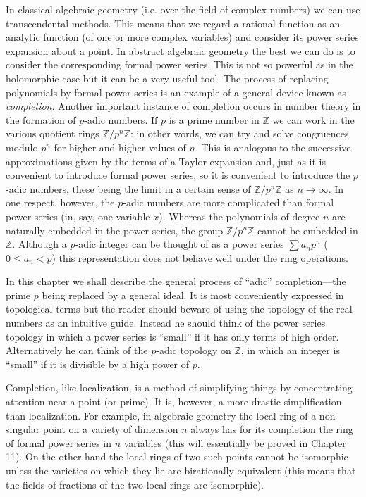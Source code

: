 In classical algebraic geometry (i.e. over the field of complex numbers) we can use transcendental methods. This means that we regard a rational function as an analytic function (of one or more complex variables) and consider its power series expansion about a point. In abstract algebraic geometry the best we can do is to consider the corresponding formal power series. This is not so powerful as in the holomorphic case but it can be a very useful tool. The process of replacing polynomials by formal power series is an example of a general device known as \textit{completion}. Another important instance of completion occurs in number theory in the formation of $p$-adic numbers. If $p$ is a prime number in $\mathbb Z$ we can work in the various quotient rings $\mathbb Z/p^n\mathbb Z$: in other words, we can try and solve congruences modulo $p^n$ for higher and higher values of $n$. This is analogous to the successive approximations given by the terms of a Taylor expansion and, just as it is convenient to introduce formal power series, so it is convenient to introduce the $p$-adic numbers, these being the limit in a certain sense of $\mathbb Z/p^n\mathbb Z$ as $n\longrightarrow\infty$. In one respect, however, the $p$-adic numbers are more complicated than formal power series (in, say, one variable $x$). Whereas the polynomials of degree $n$ are naturally embedded in the power series, the group $\mathbb Z/p^n\mathbb Z$ cannot be embedded in $\mathbb Z$. Although a $p$-adic integer can be thought of as a power series $\sum a_np^n$ ($0\leq a_n<p$) this representation does not behave well under the ring operations.

In this chapter we shall describe the general process of ``adic'' completion---the prime $p$ being replaced by a general ideal. It is most conveniently expressed in topological terms but the reader should beware of using the topology of the real numbers as an intuitive guide. Instead he should think of the power series topology in which a power series is ``small'' if it has only terms of high order. Alternatively he can think of the $p$-adic topology on $\mathbb Z$, in which an integer is ``small'' if it is divisible by a high power of $p$.

Completion, like localization, is a method of simplifying things by concentrating attention near a point (or prime). It is, however, a more drastic simplification than localization. For example, in algebraic geometry the local ring of a non-singular point on a variety of dimension $n$ always has for its completion the ring of formal power series in $n$ variables (this will essentially be proved in Chapter 11). On the other hand the local rings of two such points cannot be isomorphic unless the varieties on which they lie are birationally equivalent (this means that the fields of fractions of the two local rings are isomorphic).

